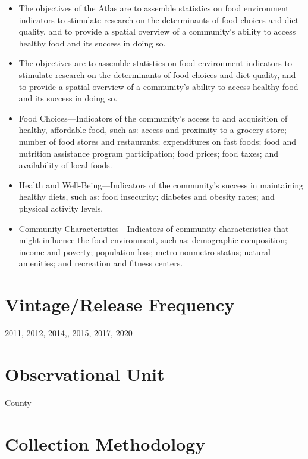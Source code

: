 \documentclass[
]{book}
\providecommand{\tightlist}{%
  \setlength{\itemsep}{0pt}\setlength{\parskip}{0pt}}
\begin{document}
\begin{itemize}
\tightlist
\item
  The objectives of the Atlas are to assemble statistics on food environment indicators to stimulate research on the determinants of food choices and diet quality, and to provide a spatial overview of a community's ability to access healthy food and its success in doing so.
\item
  The objectives are to assemble statistics on food environment indicators to stimulate research on the determinants of food choices and diet quality, and to provide a spatial overview of a community's ability to access healthy food and its success in doing so.
\item
  Food Choices---Indicators of the community's access to and acquisition of healthy, affordable food, such as: access and proximity to a grocery store; number of food stores and restaurants; expenditures on fast foods; food and nutrition assistance program participation; food prices; food taxes; and availability of local foods.
\item
  Health and Well-Being---Indicators of the community's success in maintaining healthy diets, such as: food insecurity; diabetes and obesity rates; and physical activity levels.
\item
  Community Characteristics---Indicators of community characteristics that might influence the food environment, such as: demographic composition; income and poverty; population loss; metro-nonmetro status; natural amenities; and recreation and fitness centers.
\end{itemize}

\hypertarget{vintagerelease-frequency-26}{%
\section{Vintage/Release Frequency}\label{vintagerelease-frequency-26}}

2011, 2012, 2014,, 2015, 2017, 2020

\hypertarget{observational-unit-26}{%
\section{Observational Unit}\label{observational-unit-26}}

County

\hypertarget{collection-methodology-26}{%
\section{Collection Methodology}\label{collection-methodology-26}}
\end{document}
